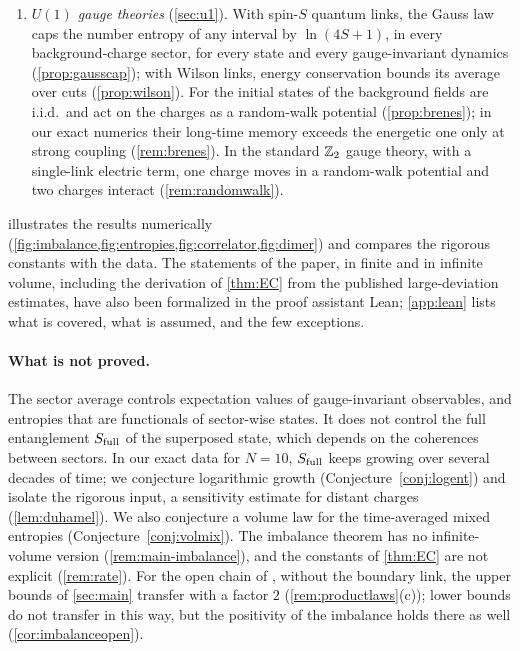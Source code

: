 \begin{enumerate}[label=(\arabic*),leftmargin=2em]
not available.
\item \emph{$U(1)$ gauge theories} (\cref{sec:u1}).  With spin-$S$ quantum links, the Gauss law caps the number
entropy of any interval by $\ln(4S+1)$, in every background-charge sector, for every state and every
gauge-invariant dynamics (\cref{prop:gausscap}); with Wilson links, energy conservation bounds its average over
cuts (\cref{prop:wilson}).  For the initial states of \cite{Brenes2018} the background fields are i.i.d.\ and act on the
charges as a random-walk potential (\cref{prop:brenes}); in our exact numerics their long-time memory exceeds the
energetic one only at strong coupling (\cref{rem:brenes}).  In the standard $\mathbb{Z}_2$ gauge theory, with a single-link electric term, one charge moves
in a random-walk potential and two charges interact (\cref{rem:randomwalk}).
\end{enumerate}
 illustrates the results numerically
(\cref{fig:imbalance,fig:entropies,fig:correlator,fig:dimer}) and compares the rigorous constants with the data.
The statements of the paper, in finite and in infinite volume, including the derivation of \cref{thm:EC} from the
published large-deviation estimates, have also been formalized in the proof assistant Lean; \cref{app:lean} lists
what is covered, what is assumed, and the few exceptions.

\paragraph{What is not proved.}
The sector average controls expectation values of gauge-invariant observables, and entropies that are
functionals of sector-wise states.  It does not control the full entanglement $S_{\mathrm{full}}$ of the superposed state,
which depends on the coherences between sectors.  In our exact data for $N=10$, $S_{\mathrm{full}}$ keeps growing over several
decades of time; we conjecture logarithmic growth (Conjecture~\ref{conj:logent}) and isolate the rigorous input, a sensitivity estimate for distant charges
(\cref{lem:duhamel}).  We also conjecture a volume law for the time-averaged mixed entropies
(Conjecture~\ref{conj:volmix}).  The imbalance theorem has no infinite-volume version
(\cref{rem:main-imbalance}), and the constants of \cref{thm:EC} are not explicit (\cref{rem:rate}).  For the open
chain of \cite{SKKM2017}, without the boundary link, the upper bounds of \cref{sec:main} transfer with a factor $2$
(\cref{rem:productlaws}(c)); lower bounds do not transfer in this way, but the positivity of the imbalance holds
there as well (\cref{cor:imbalanceopen}).

